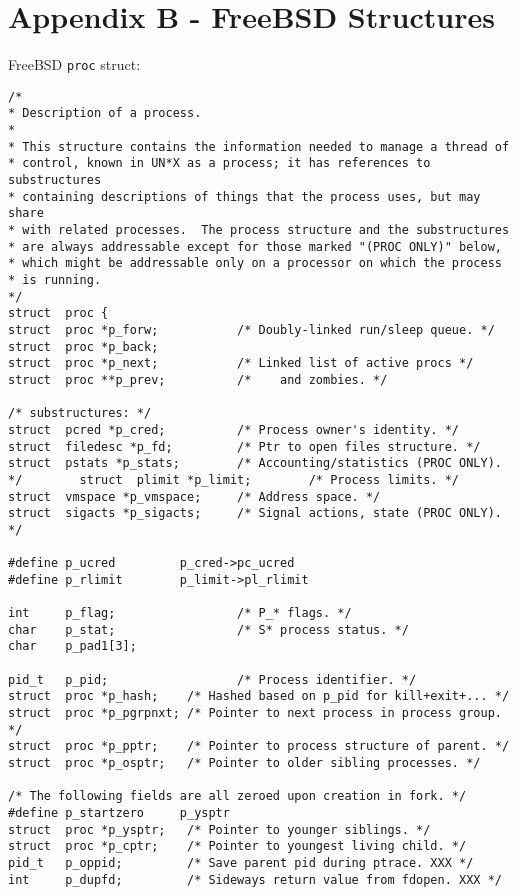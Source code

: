 \documentclass[10pt,letterpaper,onecolumn,draftclsnofoot]{IEEEtran}
\begin{document}
\section{Appendix B - FreeBSD Structures}
FreeBSD \texttt{proc} struct: \cite{freebsdstruct2016}
\begin{lstlisting}[caption=The FreeBSD proc structure is responsible for tracking the
state of processes.]
/*
* Description of a process.
*
* This structure contains the information needed to manage a thread of
* control, known in UN*X as a process; it has references to substructures
* containing descriptions of things that the process uses, but may share
* with related processes.  The process structure and the substructures
* are always addressable except for those marked "(PROC ONLY)" below,
* which might be addressable only on a processor on which the process
* is running.
*/
struct  proc {
struct  proc *p_forw;           /* Doubly-linked run/sleep queue. */
struct  proc *p_back;
struct  proc *p_next;           /* Linked list of active procs */
struct  proc **p_prev;          /*    and zombies. */

/* substructures: */
struct  pcred *p_cred;          /* Process owner's identity. */
struct  filedesc *p_fd;         /* Ptr to open files structure. */
struct  pstats *p_stats;        /* Accounting/statistics (PROC ONLY). */        struct  plimit *p_limit;        /* Process limits. */
struct  vmspace *p_vmspace;     /* Address space. */
struct  sigacts *p_sigacts;     /* Signal actions, state (PROC ONLY). */

#define p_ucred         p_cred->pc_ucred
#define p_rlimit        p_limit->pl_rlimit

int     p_flag;                 /* P_* flags. */
char    p_stat;                 /* S* process status. */
char    p_pad1[3];

pid_t   p_pid;                  /* Process identifier. */
struct  proc *p_hash;    /* Hashed based on p_pid for kill+exit+... */
struct  proc *p_pgrpnxt; /* Pointer to next process in process group. */
struct  proc *p_pptr;    /* Pointer to process structure of parent. */
struct  proc *p_osptr;   /* Pointer to older sibling processes. */

/* The following fields are all zeroed upon creation in fork. */
#define p_startzero     p_ysptr
struct  proc *p_ysptr;   /* Pointer to younger siblings. */
struct  proc *p_cptr;    /* Pointer to youngest living child. */
pid_t   p_oppid;         /* Save parent pid during ptrace. XXX */
int     p_dupfd;         /* Sideways return value from fdopen. XXX */


\end{lstlisting}
\end{document}
